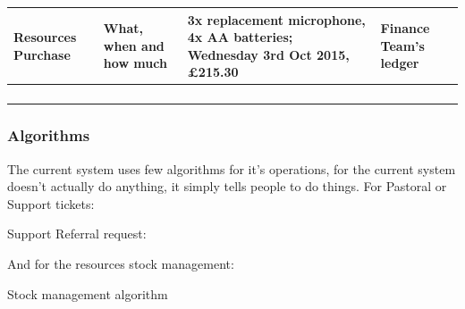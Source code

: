 \begin{table}[]
\begin{tabular}{llll}
\multicolumn{1}{|l|}{Resources Purchase} & \multicolumn{1}{l|}{What, when and how much}  & \multicolumn{1}{l|}{3x replacement microphone, 4x AA batteries; Wednesday 3rd Oct 2015, £215.30}     & \multicolumn{1}{l|}{Finance Team's ledger}             \\ \hline
\multicolumn{1}{|l|}{}                   & \multicolumn{1}{l|}{}                         & \multicolumn{1}{l|}{}                                                                                & \multicolumn{1}{l|}{}                                  \\ \hline
                                         &                                               &                                                                                                      &                                                        \\
                                         &                                               &                                                                                                      &                                                        \\
                                         &                                               &                                                                                                      &
\end{tabular}
\end{table}


\subsubsection{Algorithms}
 The current system uses few algorithms for it's operations, for the current system doesn't actually do anything, it simply tells people to do things.
For Pastoral or Support tickets:
\begin{algorithm}[H]
	\caption{Support Referral request:}
	\begin{algorithmic}[1]
		\Repeat
	\end{algorithmic}
\end{algorithm}

And for the resources stock management:
\begin{algorithm}[H]
	\caption{Stock management algorithm}
	\begin{algorithmic}[1]
	\end{algorithmic}
\end{algorithm}


